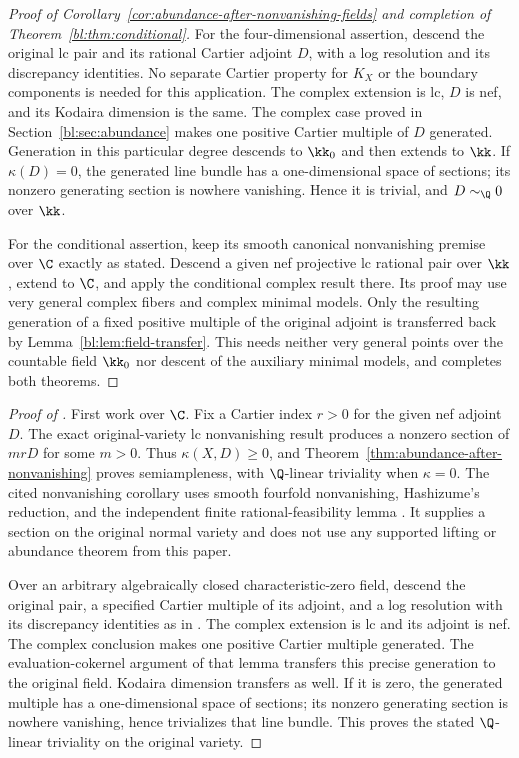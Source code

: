 \begin{proof}[Proof of Corollary~\ref{cor:abundance-after-nonvanishing-fields} and completion of Theorem~\ref{bl:thm:conditional}]
For the four-dimensional assertion, descend the original lc pair
and its rational Cartier adjoint $D$, with a log resolution and
its discrepancy identities.  No separate Cartier property for
$K_X$ or the boundary components is needed for this application.
The complex extension is lc, $D$ is nef, and its Kodaira
dimension is the same.  The complex case proved in
Section~\ref{bl:sec:abundance} makes one positive Cartier multiple
of $D$ generated.  Generation in this particular degree descends
to $\kk_0$ and then extends to $\kk$.  If $\kappa(D)=0$, the
generated line bundle has a one-dimensional space of sections;
its nonzero generating section is nowhere vanishing.  Hence it
is trivial, and $D\sim_{\Q}0$ over $\kk$.

For the conditional assertion, keep its smooth canonical
nonvanishing premise over $\C$ exactly as stated.  Descend a
given nef projective lc rational pair over $\kk$, extend to
$\C$, and apply the conditional complex result there.  Its
proof may use very general complex fibers and complex minimal
models.  Only the resulting generation of a fixed positive
multiple of the original adjoint is transferred back by
Lemma~\ref{bl:lem:field-transfer}.  This needs neither very general
points over the countable field $\kk_0$ nor descent of the
auxiliary minimal models, and completes both theorems.
\end{proof}


\begin{proof}[Proof of ]
First work over $\C$. Fix a Cartier index $r>0$ for the given
nef adjoint $D$. The exact original-variety lc nonvanishing result
\cite[Corollary~1.2]{OpenAINonvanishing2026}
produces a nonzero section of $mrD$ for some $m>0$. Thus
$\kappa(X,D)\geq0$, and Theorem~\ref{thm:abundance-after-nonvanishing}
proves semiampleness, with $\Q$-linear triviality when $\kappa=0$.
The cited nonvanishing corollary uses smooth fourfold nonvanishing,
Hashizume's reduction, and the independent finite rational-feasibility
lemma \cite[Lemma~8.1]{OpenAINonvanishing2026}.
It supplies a section on the original normal variety and does not use
any supported lifting or abundance theorem from this paper.

Over an arbitrary algebraically closed characteristic-zero field,
descend the original pair, a specified Cartier multiple of its
adjoint, and a log resolution with its discrepancy identities as in
. The complex extension is lc and its
adjoint is nef. The complex conclusion makes one positive Cartier
multiple generated. The evaluation-cokernel argument of that lemma
transfers this precise generation to the original field. Kodaira
dimension transfers as well. If it is zero, the generated multiple
has a one-dimensional space of sections; its nonzero generating
section is nowhere vanishing, hence trivializes that line bundle.
This proves the stated $\Q$-linear triviality on the original variety.
\end{proof}
